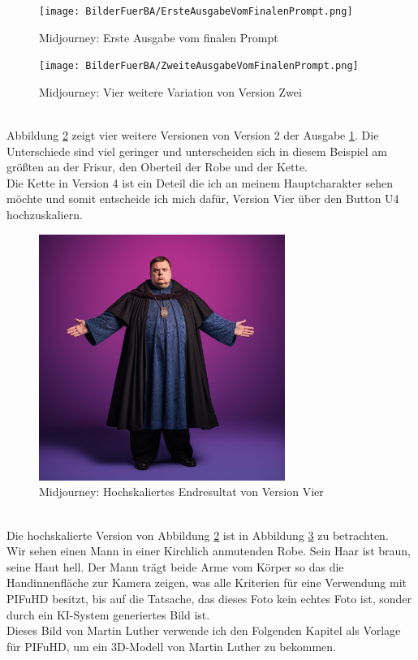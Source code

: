 \begin{figure}[h]
	\centering
	\texttt{[image: BilderFuerBA/ErsteAusgabeVomFinalenPrompt.png]}
	\caption{Midjourney: Erste Ausgabe vom finalen Prompt}
	\label{ErsteAusgabeVomFinalenPrompt}
\end{figure}
\begin{figure}[h]
	\centering
	\texttt{[image: BilderFuerBA/ZweiteAusgabeVomFinalenPrompt.png]}
	\caption{Midjourney: Vier weitere Variation von Version Zwei}
	\label{ZweiteAusgabeVomFinalenPrompt}
\end{figure}
\\
Abbildung \ref{ZweiteAusgabeVomFinalenPrompt} zeigt vier weitere Versionen von Version 2 der Ausgabe \ref{ErsteAusgabeVomFinalenPrompt}. Die Unterschiede sind viel geringer und unterscheiden sich in diesem Beispiel am größten an der Frisur, den Oberteil der Robe und der Kette.
\\
Die Kette in Version 4 ist ein Deteil die ich an meinem Hauptcharakter sehen möchte und somit entscheide ich mich dafür, Version Vier über den Button U4 hochzuskaliern.
\begin{figure}[h]
	\centering
	\includegraphics[width=8.022cm]{BilderFuerBA/DritteAusgabeVomFinalenPrompt.png}
	\caption{Midjourney: Hochskaliertes Endresultat von Version Vier}
	\label{DritteAusgabeVomFinalenPrompt}
\end{figure}
\\
Die hochskalierte Version von Abbildung \ref{ZweiteAusgabeVomFinalenPrompt} ist in Abbildung \ref{DritteAusgabeVomFinalenPrompt} zu betrachten.
\\
Wir sehen einen Mann in einer Kirchlich anmutenden Robe. Sein Haar ist braun, seine Haut hell. Der Mann trägt beide Arme vom Körper so das die Handinnenfläche zur Kamera zeigen, was alle Kriterien für eine Verwendung mit PIFuHD besitzt, bis auf die Tatsache, das dieses Foto kein echtes Foto ist, sonder durch ein KI-System generiertes Bild ist.
\\
Dieses Bild von Martin Luther verwende ich den Folgenden Kapitel als Vorlage für PIFuHD, um ein 3D-Modell von Martin Luther zu bekommen.

